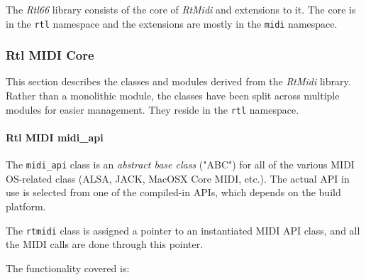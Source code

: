    The \textsl{Rtl66} library consists of the core of \textsl{RtMidi} and
   extensions to it. The core is in the \texttt{rtl} namespace and
   the extensions are mostly in the \texttt{midi} namespace.

\subsubsection{Rtl MIDI Core}
\label{subsubsec:rtl_midi_core}

   This section describes the classes and modules derived from the
   \textsl{RtMidi} library.
   Rather than a monolithic module, the classes have been split across
   multiple modules for easier management.
   They reside in the \texttt{rtl} namespace.

\paragraph{Rtl MIDI midi\_api}
\label{paragraph:rtl_midi_midi_api}

   The \texttt{midi\_api} class is an \textsl{abstract base class}
   ("ABC") for all of the various MIDI OS-related class (ALSA, JACK,
   MacOSX Core MIDI, etc.).
   The actual API in use is selected from one of the compiled-in
   APIs, which depends on the build platform.

   The \texttt{rtmidi} class is assigned a pointer to an instantiated
   MIDI API class, and all the MIDI calls are done through this pointer.

   The functionality covered is:

